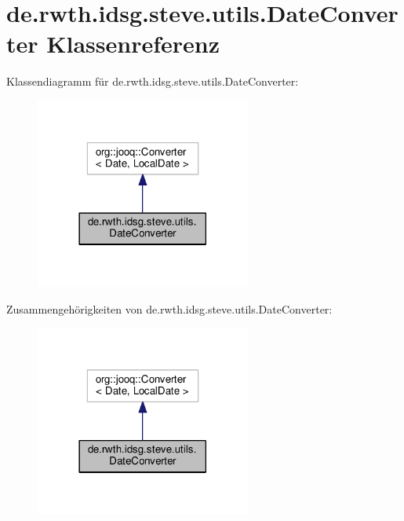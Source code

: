 \hypertarget{classde_1_1rwth_1_1idsg_1_1steve_1_1utils_1_1_date_converter}{\section{de.\+rwth.\+idsg.\+steve.\+utils.\+Date\+Converter Klassenreferenz}
\label{classde_1_1rwth_1_1idsg_1_1steve_1_1utils_1_1_date_converter}
}


Klassendiagramm für de.\+rwth.\+idsg.\+steve.\+utils.\+Date\+Converter\+:\nopagebreak
\begin{figure}[H]
\begin{center}
\leavevmode
\includegraphics[width=201pt]{classde_1_1rwth_1_1idsg_1_1steve_1_1utils_1_1_date_converter__inherit__graph}
\end{center}
\end{figure}


Zusammengehörigkeiten von de.\+rwth.\+idsg.\+steve.\+utils.\+Date\+Converter\+:\nopagebreak
\begin{figure}[H]
\begin{center}
\leavevmode
\includegraphics[width=201pt]{classde_1_1rwth_1_1idsg_1_1steve_1_1utils_1_1_date_converter__coll__graph}
\end{center}
\end{figure}

